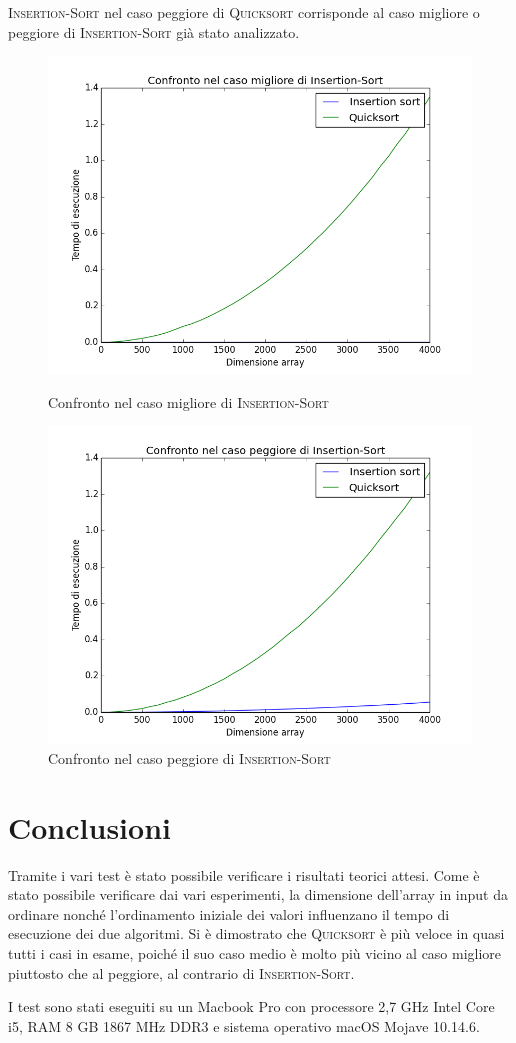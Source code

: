 \documentclass[11pt]{article}
\begin{document}
\textsc{Insertion-Sort} nel caso peggiore di \textsc{Quicksort} corrisponde al caso migliore o peggiore di \textsc{Insertion-Sort} già stato analizzato.
\newpage
\begin{figure}[h]
\centering
\includegraphics[scale=0.33,angle=0]{migliore_confronto.png}
\caption{Confronto nel caso migliore di \textsc{Insertion-Sort}}
\label{migliore_confronto}
\centering
\includegraphics[scale=0.33,angle=0]{peggiore_confronto.png}
\caption{Confronto nel caso peggiore di \textsc{Insertion-Sort}}
\label{peggiore_confronto}
\end{figure}
\section{Conclusioni}
Tramite i vari test è stato possibile verificare i risultati teorici attesi. Come è stato possibile verificare dai vari esperimenti, la dimensione dell'array in input da ordinare nonché l'ordinamento iniziale dei valori influenzano il tempo di esecuzione dei due algoritmi. Si è dimostrato che \textsc{Quicksort} è più veloce in quasi tutti i casi in esame, poiché il suo caso medio è molto più vicino al caso migliore piuttosto che al peggiore, al contrario di \textsc{Insertion-Sort}.

I test sono stati eseguiti su un Macbook Pro con processore 2,7 GHz Intel Core i5, RAM 8 GB 1867 MHz DDR3 e sistema operativo macOS Mojave 10.14.6.
\end{document}
